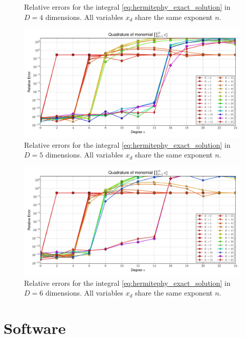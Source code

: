 \documentclass[a4paper,10pt]{article}
\begin{document}
\begin{subfigures}
\begin{figure}
    \caption{Relative errors for the integral \eqref{eq:hermitephy_exact_solution}
    in $D=4$ dimensions. All variables $x_d$ share the same exponent $n$.}
    \label{fig:monomial_errors_hermitephy_multivariate_dimension_4}
  \end{figure}
  \begin{figure}\centering
    \includegraphics[width=\linewidth]{./img/monomial_errors_hermitephy_multivariate_dimension_5.pdf}
    \caption{Relative errors for the integral \eqref{eq:hermitephy_exact_solution}
    in $D=5$ dimensions. All variables $x_d$ share the same exponent $n$.}
    \label{fig:monomial_errors_hermitephy_multivariate_dimension_5}
  \end{figure}
  \begin{figure}\centering
    \includegraphics[width=\linewidth]{./img/monomial_errors_hermitephy_multivariate_dimension_6.pdf}
    \caption{Relative errors for the integral \eqref{eq:hermitephy_exact_solution}
    in $D=6$ dimensions. All variables $x_d$ share the same exponent $n$.}
    \label{fig:monomial_errors_hermitephy_multivariate_dimension_6}
  \end{figure}
\end{subfigures}


\FloatBarrier
\section{Software}
\end{document}
